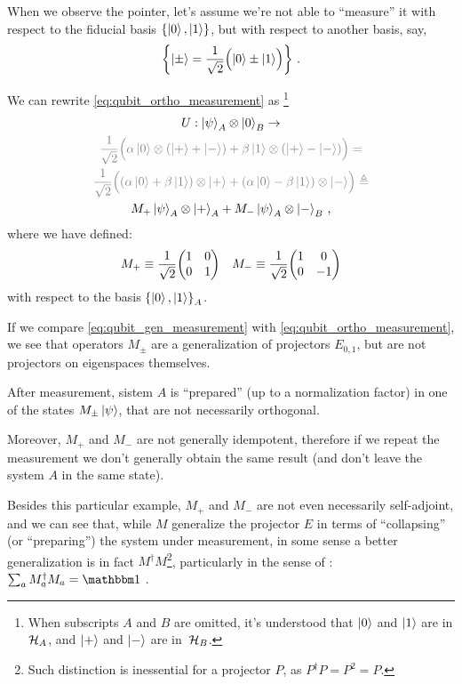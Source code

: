 When we observe the pointer, let's assume we're not
able to ``measure'' it with respect to the fiducial basis
$\left\{\ket{0}, \ket{1}\right\}$,
but with respect to another basis, say,
\begin{equation}\label{eq:pmbasis}
\left\{\ket{\pm} = \frac{1}{\sqrt{2}} \qty\Big(\ket{0} \pm \ket{1})\right\} \,\text{.}
\end{equation}

We can rewrite \eqref{eq:qubit_ortho_measurement} as
\footnote{
  When subscripts $A$ and $B$ are omitted, it's understood that
  $\ket{0}$ and $\ket{1}$ are in $\mathcal{H}_A$, and
  $\ket{+}$ and $\ket{-}$ are in~$\mathcal{H}_B$.
}
\begin{multline}\label{eq:qubit_gen_measurement}
  U: \ket{\psi}_A \ox \ket{0}_B                   \rightarrow \\
  \color{gray}
  \frac{1}{\sqrt{2}} \qty\Big(
    \alpha\ket{0} \ox \qty(\ket{+}+\ket{-}) +
    \beta \ket{1} \ox \qty(\ket{+}-\ket{-})
  )                                               =           \\
  \color{gray}
  \frac{1}{\sqrt{2}} \qty\Big(
    \qty(\alpha\ket{0} + \beta\ket{1}) \ox \ket{+} +
    \qty(\alpha\ket{0} - \beta\ket{1}) \ox \ket{-}
  )                                               \eqdef      \\
  M_+\ket{\psi}_A \ox \ket{+}_A + M_-\ket{\psi}_A \ox \ket{-}_B
  \,\text{,}
\end{multline}
where we have defined:
\begin{align*}
  &
  M_+ \repr \frac{1}{\sqrt{2}}\mqty(\imat{2})
  &
  M_- \repr \frac{1}{\sqrt{2}}\mqty(\dmat[0]{1, -1})
\end{align*}
with respect to the basis $\left\{\ket{0}, \ket{1}\right\}_A$.

If we compare \eqref{eq:qubit_gen_measurement}
with \eqref{eq:qubit_ortho_measurement},
we see that operators $M_{\pm}$
are a generalization of projectors $E_{0,1}$,
but are not projectors on eigenspaces themselves.

After measurement, sistem $A$ is ``prepared''
(up to a normalization factor)
in one of the states $M_{\pm}\ket{\psi}$,
that are not necessarily orthogonal.

Moreover, $M_+$ and $M_-$ are not generally idempotent,
therefore if we repeat the measurement we don't generally
obtain the same result (and don't leave the system $A$ in the same state).

Besides this particular example, $M_+$ and $M_-$ are not even necessarily
self-adjoint, and we can see that, while $M$ generalize the projector $E$
in terms of ``collapsing'' (or ``preparing'') the system under measurement,
in some sense a better generalization is in fact $M^{\dagger}M$\footnote{
  Such distinction is inessential for a projector $P$,
  as $P^{\dagger}P = P^2 = P$.
}, particularly in the sense of :
$\sum_a M_a^{\dagger}M_a = \idop$ \parencite[Sec. 3.1]{PreskillNotes}.

